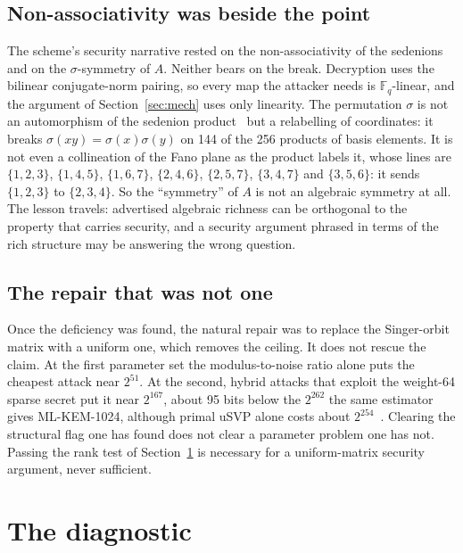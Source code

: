 \documentclass[11pt]{article}
\makeatletter
\theoremstyle{remark}
\newcommand{\F}{\mathbb{F}}
\DeclareRobustCommand{\_}{%
  \edef\@tempa{\ttdefault}%
  \ifx\f@family\@tempa\char95 \else\textunderscore\fi\penalty300\relax}
\makeatother
\begin{document}
\subsection{Non-associativity was beside the point}

The scheme's security narrative rested on the non-associativity of the sedenions and on the $\sigma$-symmetry of $A$.
Neither bears on the break. Decryption uses the bilinear conjugate-norm pairing, so every map the attacker needs is
$\F_q$-linear, and the argument of Section~\ref{sec:mech} uses only linearity. The permutation $\sigma$ is not an
automorphism of the sedenion product~\cite{GifNote} but a relabelling of coordinates: it breaks
$\sigma(xy)=\sigma(x)\sigma(y)$ on 144 of the 256 products of basis elements. It is not even a collineation of the Fano plane as the product labels
it, whose lines are $\{1,2,3\}$, $\{1,4,5\}$, $\{1,6,7\}$, $\{2,4,6\}$, $\{2,5,7\}$, $\{3,4,7\}$ and $\{3,5,6\}$: it
sends $\{1,2,3\}$ to $\{2,3,4\}$. So the ``symmetry'' of $A$ is not an algebraic symmetry at all. The lesson travels:
advertised algebraic richness can be orthogonal to the property that carries security, and a security argument phrased
in terms of the rich structure may be answering the wrong question.

\subsection{The repair that was not one}\label{sec:repair}

Once the deficiency was found, the natural repair was to replace the Singer-orbit matrix with a uniform one, which
removes the ceiling. It does not rescue the claim. At the first parameter set the modulus-to-noise ratio alone puts the
cheapest attack near $2^{51}$. At the second, hybrid attacks that exploit the weight-64 sparse secret put it near
$2^{167}$, about 95 bits below the $2^{262}$ the same estimator gives ML-KEM-1024, although primal uSVP alone costs
about $2^{254}$~\cite{GifNote}. Clearing the structural flag one has found does not clear a parameter problem one has
not. Passing the rank test of Section~\ref{sec:diag} is necessary for a uniform-matrix security argument, never
sufficient.

\section{The diagnostic}\label{sec:diag}
\end{document}
